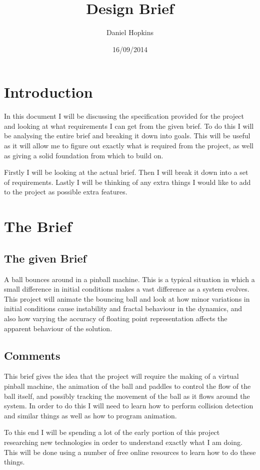 \documentclass[11pt]{article} %
\title{Design Brief}
\author{Daniel Hopkins}
\date{16/09/2014} %
\begin{document}
\maketitle
\tableofcontents

\section{Introduction}

In this document I will be discussing the specification provided for the project and looking at what requirements I can get from the given brief. To do this I will be analysing the entire brief and breaking it down into goals. This will be useful as it will allow me to figure out exactly what is required from the project, as well as giving a solid foundation from which to build on.

Firstly I will be looking at the actual brief. Then I will break it down into a set of requirements. Lastly I will be thinking of any extra things I would like to add to the project as possible extra features.

\section{The Brief}
\subsection{The given Brief}
A ball bounces around in a pinball machine. This is a typical situation in which a small difference in initial conditions makes a vast difference as a system evolves. This project will animate the bouncing ball and look at how minor variations in initial conditions cause instability and fractal behaviour in the dynamics, and also how varying the accuracy of floating point representation affects the apparent behaviour of the solution.

\subsection{Comments}

This brief gives the idea that the project will require the making of a virtual pinball machine, the animation of the ball and paddles to control the flow of the ball itself, and possibly tracking the movement of the ball as it flows around the system. In order to do this I will need to learn how to perform collision detection and similar things as well as how to program animation.

To this end I will be spending a lot of the early portion of this project researching new technologies in order to understand exactly what I am doing. This will be done using a number of free online resources to learn how to do these things.
\end{document}
